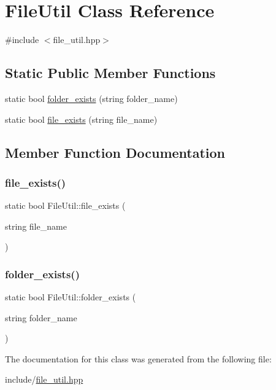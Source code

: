 \hypertarget{classFileUtil}{}\section{File\+Util Class Reference}
\label{classFileUtil}


{\ttfamily \#include $<$file\+\_\+util.\+hpp$>$}

\subsection*{Static Public Member Functions}
\begin{DoxyCompactItemize}
\item 
static bool \hyperlink{classFileUtil_af2aa664a3cee3c3d9a0c07d4312e6c2d}{folder\+\_\+exists} (string folder\+\_\+name)
\item 
static bool \hyperlink{classFileUtil_a3ee8a43a763142c166ea87e50bbde33d}{file\+\_\+exists} (string file\+\_\+name)
\end{DoxyCompactItemize}


\subsection{Member Function Documentation}
\mbox{\label{classFileUtil_a3ee8a43a763142c166ea87e50bbde33d}} 
\subsubsection{\texorpdfstring{file\+\_\+exists()}{file\_exists()}}
{\footnotesize\ttfamily static bool File\+Util\+::file\+\_\+exists (\begin{DoxyParamCaption}\item[{string}]{file\+\_\+name }\end{DoxyParamCaption})\hspace{0.3cm}{\ttfamily [static]}}

\mbox{\label{classFileUtil_af2aa664a3cee3c3d9a0c07d4312e6c2d}} 
\subsubsection{\texorpdfstring{folder\+\_\+exists()}{folder\_exists()}}
{\footnotesize\ttfamily static bool File\+Util\+::folder\+\_\+exists (\begin{DoxyParamCaption}\item[{string}]{folder\+\_\+name }\end{DoxyParamCaption})\hspace{0.3cm}{\ttfamily [static]}}



The documentation for this class was generated from the following file\+:\begin{DoxyCompactItemize}
\item 
include/\hyperlink{file__util_8hpp}{file\+\_\+util.\+hpp}\end{DoxyCompactItemize}
